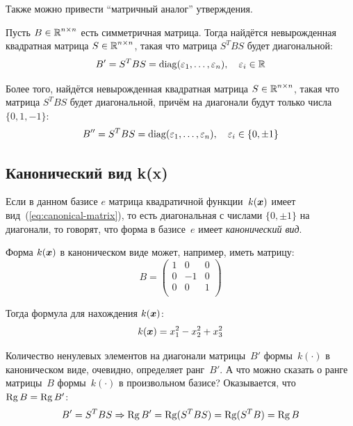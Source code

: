 \documentclass[a4paper,12pt]{article}
\begin{document}
  Также можно привести ``матричный аналог'' утверждения.
  
  \begin{theorem}
    Пусть $B \hm\in \RR^{n \times n}$ есть симметричная матрица.
    Тогда найдётся невырожденная квадратная матрица $S \hm\in \RR^{n \times n}$, такая что матрица $S^T B S$ будет диагональной:
    \[
      B' = S^T B S = \operatorname{diag}(\varepsilon_1, \ldots, \varepsilon_n),\quad \varepsilon_i \in \operatorname{\mathbb R}
    \]
    
    Более того, найдётся невырожденная квадратная матрица $S \hm\in \RR^{n \times n}$, такая что матрица $S^T B S$ будет диагональной, причём на диагонали будут только числа $\{0, 1, -1\}$:
    \[
      B'' = S^T B S = \operatorname{diag}(\varepsilon_1, \ldots, \varepsilon_n),\quad \varepsilon_i \in \{0, \pm 1\}
    \]
  \end{theorem}
  
  
  \subsection{Канонический вид k(x)}
  
  Если в данном базисе $e$ матрица квадратичной функции~$k(\boldsymbol x)$ имеет вид~(\ref{eq:canonical-matrix}), то есть диагональная с числами $\{0, \pm 1\}$ на диагонали, то говорят, что форма в базисе~$e$ имеет \emph{канонический вид}.
  
  \begin{example}
    Форма $k(\boldsymbol x)$ в каноническом виде может, например, иметь матрицу:
    \[
      B = \begin{pmatrix}
        1 & 0  & 0\\
        0 & -1 & 0\\
        0 & 0  & 1\\
      \end{pmatrix}
    \]
    
    Тогда формула для нахождения $k(\boldsymbol x)$:
    \[
      k(\boldsymbol x) = x_1^2 - x_2^2 + x_3^2
    \]
  \end{example}
  
  Количество ненулевых элементов на диагонали матрицы~$B'$ формы~$k(\cdot)$ в каноническом виде, очевидно, определяет ранг~$B'$.
  А что можно сказать о ранге матрицы~$B$ формы~$k(\cdot)$ в произвольном базисе?
  Оказывается, что $\Rg B \hm= \Rg B'$:
  \[
    B' = S^T B S \Rightarrow \operatorname{Rg} B' = \operatorname{Rg} (S^T B S) = \operatorname{Rg} (S^T B) = \operatorname{Rg} B
  \]
  
\end{document}
